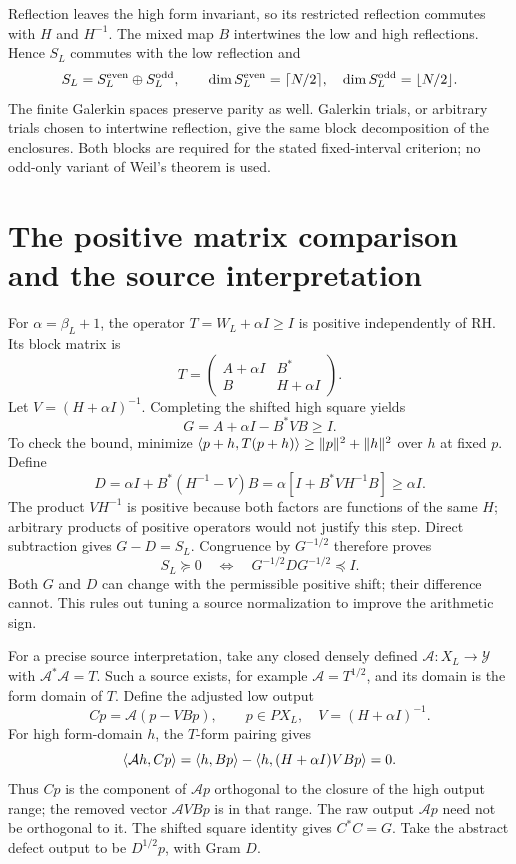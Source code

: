 Reflection leaves the high form invariant, so its restricted reflection
commutes with $H$ and $H^{-1}$. The mixed map $B$ intertwines the low and
high reflections. Hence $S_L$ commutes with the low reflection and
\[
S_L=S_L^{\rm even}\oplus S_L^{\rm odd},\qquad
\dim S_L^{\rm even}=\lceil N/2\rceil,\quad
\dim S_L^{\rm odd}=\lfloor N/2\rfloor.
\]
The finite Galerkin spaces preserve parity as well. Galerkin trials, or
arbitrary trials chosen to intertwine reflection, give the same block
decomposition of the enclosures. Both blocks are required for the stated
fixed-interval criterion; no odd-only variant of Weil's theorem is used.

\section{The positive matrix comparison and the source interpretation}
For $\alpha=\beta_L+1$, the operator $T=W_L+\alpha I\ge I$ is positive
independently of RH. Its block matrix is
\[
T=\begin{pmatrix}A+\alpha I&B^*\\B&H+\alpha I\end{pmatrix}.
\]
Let $V=(H+\alpha I)^{-1}$. Completing the shifted high square yields
\[
G=A+\alpha I-B^*VB\ge I.
\]
To check the bound, minimize $\langle p+h,T(p+h)\rangle\ge\lVert p\rVert^2+\lVert h\rVert^2$
over $h$ at fixed $p$. Define
\[
D=\alpha I+B^*(H^{-1}-V)B
=\alpha[I+B^*VH^{-1}B]\ge\alpha I.
\]
The product $VH^{-1}$ is positive because both factors are functions of
the same $H$; arbitrary products of positive operators would not justify
this step. Direct subtraction gives $G-D=S_L$. Congruence by $G^{-1/2}$
therefore proves
\begin{equation}\label{d:contraction}
S_L\succeq0\quad\Longleftrightarrow\quad
G^{-1/2}DG^{-1/2}\preceq I.
\end{equation}
Both $G$ and $D$ can change with the permissible positive shift; their
difference cannot. This rules out tuning a source normalization to improve
the arithmetic sign.

For a precise source interpretation, take any closed densely defined
$\mathcal A:X_L\to\mathcal Y$ with $\mathcal A^*\mathcal A=T$.
Such a source exists, for example $\mathcal A=T^{1/2}$, and its domain
is the form domain of $T$. Define the adjusted low output
\begin{equation}\label{d:projected-source}
Cp=\mathcal A(p-VBp),\qquad p\in PX_L,\quad V=(H+\alpha I)^{-1}.
\end{equation}
For high form-domain $h$, the $T$-form pairing gives
\[
\langle \mathcal A h,Cp\rangle
=\langle h,Bp\rangle-\langle h,(H+\alpha I)VBp\rangle=0.
\]
Thus $Cp$ is the component of $\mathcal Ap$ orthogonal to the closure
of the high output range; the removed vector $\mathcal AVBp$ is in that
range. The raw output $\mathcal Ap$ need not be orthogonal to it.
The shifted square identity gives $C^*C=G$. Take the abstract defect
output to be $D^{1/2}p$, with Gram $D$.


